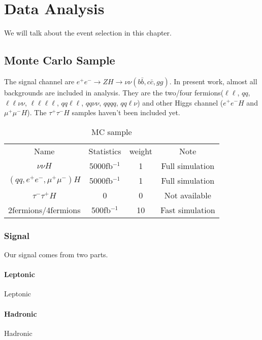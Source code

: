 
\chapter{Data Analysis}
\label{chap:3}

We will talk about the event selection in this chapter.

\section{Monte Carlo Sample}

The signal channel are $e^+e^-\to ZH \to\nu\nu(b\bar{b},c\bar{c},gg)$. In present work, almost all backgrounds are included in analysis.
They are the two/four fermions($\ell\ell$, $qq$, $\ell\ell\nu\nu$, $\ell\ell\ell\ell$, $qq\ell\ell$, $qq\nu\nu$, $qqqq$, $qq\ell\nu$) and other Higgs channel ($e^+e^-H$ and $\mu^+\mu^-H$). The $\tau^+\tau^- H$ samples haven't been included yet.
\begin{table}[!htb]
\centering
\begin{tabular}{c|c|c|c}
Name                           &Statistics             & weight& Note \\
$\nu\nu H$                     &5000fb$^{-1}$          &1      &  Full simulation\\
$(qq,e^+e^-,\mu^+\mu^-)H$      &5000fb$^{-1}$          &1      &  Full simulation\\
$\tau^-\tau^+H$                &0                      &0      &  Not available \\
2fermions/4fermions            &500fb$^{-1}$           &10     &  Fast simulation\\
\end{tabular}
\caption{MC sample}\label{MCSample}
\end{table}

\subsection{Signal}
Our signal comes from two parts.
\subsubsection{Leptonic}
Leptonic

\subsubsection{Hadronic}
Hadronic
